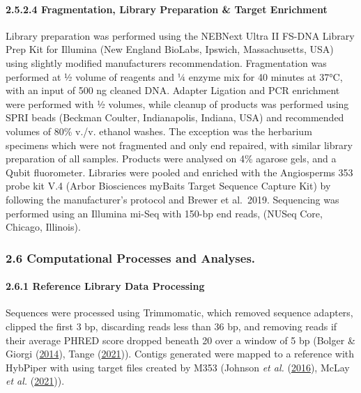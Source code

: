 \documentclass[
]{article}
\begin{document}
\hypertarget{fragmentation-library-preparation-target-enrichment}{%
\paragraph{2.5.2.4 \textbar{} Fragmentation, Library Preparation \&
Target
Enrichment}\label{fragmentation-library-preparation-target-enrichment}}

Library preparation was performed using the NEBNext Ultra II FS-DNA
Library Prep Kit for Illumina (New England BioLabs, Ipswich,
Massachusetts, USA) using slightly modified manufacturers
recommendation. Fragmentation was performed at ½ volume of reagents and
¼ enzyme mix for 40 minutes at 37°C, with an input of 500 ng cleaned
DNA. Adapter Ligation and PCR enrichment were performed with ½ volumes,
while cleanup of products was performed using SPRI beads (Beckman
Coulter, Indianapolis, Indiana, USA) and recommended volumes of 80\%
v./v. ethanol washes. The exception was the herbarium specimens which
were not fragmented and only end repaired, with similar library
preparation of all samples. Products were analysed on 4\% agarose gels,
and a Qubit fluorometer. Libraries were pooled and enriched with the
Angiosperms 353 probe kit V.4 (Arbor Biosciences myBaits Target Sequence
Capture Kit) by following the manufacturer's protocol and Brewer et
al.~2019. Sequencing was performed using an Illumina mi-Seq with 150-bp
end reads, (NUSeq Core, Chicago, Illinois).

\hypertarget{computational-processes-and-analyses.}{%
\subsubsection{2.6 \textbar{} Computational Processes and
Analyses.}\label{computational-processes-and-analyses.}}

\hypertarget{reference-library-data-processing}{%
\paragraph{2.6.1 \textbar{} Reference Library Data
Processing}\label{reference-library-data-processing}}

Sequences were processed using Trimmomatic, which removed sequence
adapters, clipped the first 3 bp, discarding reads less than 36 bp, and
removing reads if their average PHRED score dropped beneath 20 over a
window of 5 bp (Bolger \& Giorgi
(\protect\hyperlink{ref-bolger2014trimmomatic}{2014}), Tange
(\protect\hyperlink{ref-tange_2022_6377950}{2021})). Contigs generated
were mapped to a reference with HybPiper with using target files created
by M353 (Johnson \emph{et al.}
(\protect\hyperlink{ref-johnson2016hybpiper}{2016}), McLay \emph{et al.}
(\protect\hyperlink{ref-mclay2021new}{2021})).
\end{document}
